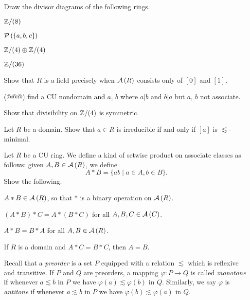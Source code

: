 \begin{exercise}
Draw the divisor diagrams of the following rings.
\begin{proplist*}
\item \(\mathbb{Z}/(8)\)
\item \(\mathcal{P}\left(\{a,b,c\}\right)\)
\item \(\mathbb{Z}/(4) \oplus \mathbb{Z}/(4)\)
\item \(\mathbb{Z}/(36)\)
\end{proplist*}
\end{exercise}

\begin{exercise}
Show that \(R\) is a field precisely when \( \mathcal{A}\left(R\right) \) consists only of \([0]\) and \([1]\).
\end{exercise}

\begin{exercise}
(@@@) find a CU nondomain and \(a\), \(b\) where \(a|b\) and \(b|a\) but \(a\), \(b\) not associate.
\end{exercise}

\begin{exercise}
Show that divisibility on \(\mathbb{Z}/(4)\) is symmetric.
\end{exercise}

\begin{exercise}
Let \(R\) be a domain. Show that \(a \in R\) is irreducible if and only if \([a]\) is \(\lesssim\)-minimal.
\end{exercise}

\begin{exercise} \label{exerc:assoc-prod}
Let \(R\) be a CU ring. We define a kind of setwise product on associate classes as follows: given \(A,B \in  \mathcal{A}\left(R\right) \), we define \[ A \ast B = \{ ab \mid a \in A, b \in B \}. \] Show the following.
\begin{proplist*}
\item \(A \ast B \in  \mathcal{A}\left(R\right) \), so that \(\ast\) is a binary operation on \( \mathcal{A}\left(R\right) \).
\item \((A \ast B) \ast C = A \ast (B \ast C)\) for all \(A,B,C \in  \mathcal{A}\left(C\right) \).
\item \(A \ast B = B \ast A\) for all \(A,B \in  \mathcal{A}\left(R\right) \).
\item If \(R\) is a domain and \(A \ast C = B \ast C\), then \(A = B\). \label{exerc:assoc-prod:cancel}
\end{proplist*}
\end{exercise}

\begin{dfn}
Recall that a \emph{preorder} is a set \(P\) equipped with a relation \(\lesssim\) which is reflexive and transitive. If \(P\) and \(Q\) are preorders, a mapping \(\varphi : P \rightarrow Q\) is called \emph{monotone}  if whenever \(a \lesssim b\) in \(P\) we have \(\varphi(a) \lesssim \varphi(b)\) in \(Q\). Similarly, we say \(\varphi\) is \emph{antitone} if whenever \(a \lesssim b\) in \(P\) we have \(\varphi(b) \lesssim \varphi(a)\) in \(Q\).
\end{dfn}

